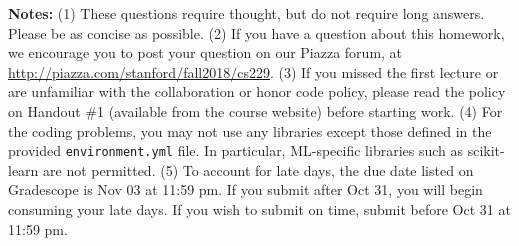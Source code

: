 {\bf Notes:} (1) These questions require thought, but do not require long
answers. Please be as concise as possible. (2) If you have a question
about this homework, we encourage you to post your question on our
Piazza forum, at \url{http://piazza.com/stanford/fall2018/cs229}. (3) If you
missed the first lecture or are unfamiliar with the collaboration or honor
code policy, please read the policy on Handout \#1 (available from the
course website) before starting work. (4) For the coding problems, you may not
use any libraries except those defined in the provided \texttt{environment.yml}
file. In particular, ML-specific libraries such as scikit-learn are not
permitted. (5) To account for late days, the due date listed on Gradescope is
Nov 03 at 11:59 pm. If you submit after Oct 31, you will begin consuming your
late days. If you wish to submit on time, submit before Oct 31 at 11:59 pm.
